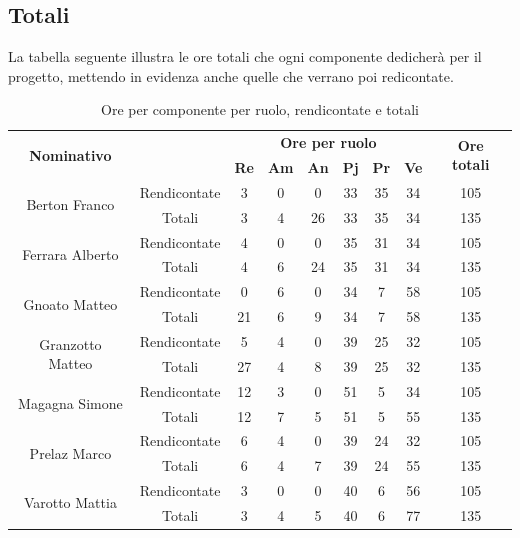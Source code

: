 \subsection{Totali}
La tabella seguente illustra le ore totali che ogni componente dedicherà per il progetto, mettendo in evidenza anche quelle che verrano poi redicontate.
\begin{table}[H]
	\begin{center}
		\begin{tabular}{|c|c|c|c|c|c|c|c|c|}
			\hline
			\multirow{2}{*}{\textbf{Nominativo}} & & \multicolumn{6}{c|}{\textbf{Ore per ruolo}} & \multirow{2}{*}{\textbf{Ore totali}} \\
			& & \textbf{Re} & \textbf{Am} & \textbf{An} & \textbf{Pj} & \textbf{Pr} & \textbf{Ve} & \\
			\hline
			\hline
			\multirow{2}{*}{Berton Franco}		&	Rendicontate	&	3	&	0	&	0	&	33	&	35	& 34 	&	105	\\
			\cline{2-9}
			&	Totali			&	3	&	4	&	26	&	33	&	35	& 	34	&	135	\\
			\hline	
			\hline
			\multirow{2}{*}{Ferrara Alberto}	&	Rendicontate	&	4	&	0	&	0	&	35	&	31	&  34	&	105	\\
			\cline{2-9}
			&	Totali			&	4	&	6	&	24	&	35	&	31	& 	34	&	135	\\
			\hline
			\hline
			\multirow{2}{*}{Gnoato Matteo}	&	Rendicontate	&	0	&	6	&	0	&	34	&	7	&	58	&	105	\\
			\cline{2-9}
			&	Totali			&	21	&	6	&	9	&	34	&	7	&	58	&	135	\\
			\hline
			\hline					
			\multirow{2}{*}{Granzotto Matteo}	&	Rendicontate	&	5	&	4	&	0	&	39	&	25	&	32	&	105	\\
			\cline{2-9}
			&	Totali			&	27	&	4	&	8	&	39	&	25	&	32	&	135	\\
			\hline
			\hline
			\multirow{2}{*}{Magagna Simone}		&	Rendicontate	&	12	&	3	&	0	&	51	&	5	& 	34	&	105	\\
			\cline{2-9}
			&	Totali			&	12	&	7	&	5	&	51	&	5	& 	55	&	135	\\
			\hline			
			\hline
			\multirow{2}{*}{Prelaz Marco}	&	Rendicontate	&	6	&	4	&	0	&	39	&	24	& 	32	&	105	\\
			\cline{2-9}
			&	Totali			&	6	&	4	&	7	&	39	&	24	& 	55	&	135	\\
			\hline
			\hline			
			\multirow{2}{*}{Varotto Mattia}	&	Rendicontate	&	3	&	0	&	0	&	40	&	6	& 	56	&	105	\\
			\cline{2-9}
			&	Totali			&	3	&	4	&	5	&	40	&	6	& 	77	&	135	\\
			\hline
		\end{tabular}
	\end{center}
	\caption{Ore per componente per ruolo, rendicontate e totali}
\end{table}
